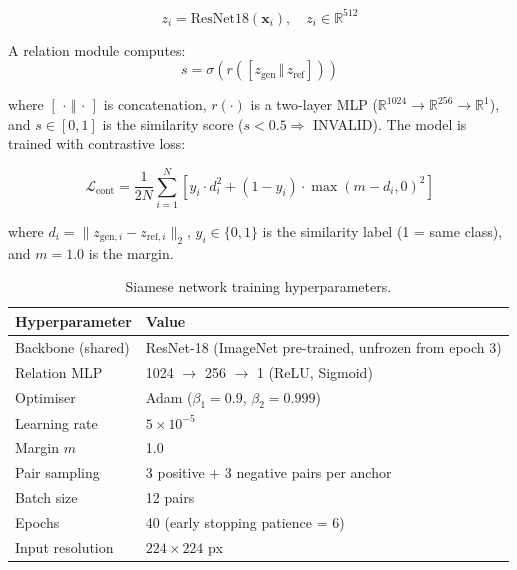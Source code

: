 \begin{equation}
z_i = \text{ResNet18}(\mathbf{x}_i),\quad z_i \in \mathbb{R}^{512}
\label{eq:encoder}
\end{equation}

A relation module computes:
\begin{equation}
s = \sigma\!\left(r\!\left([z_\text{gen} \,\Vert\, z_\text{ref}]\right)\right)
\label{eq:relation}
\end{equation}

where $[\,\cdot\,\Vert\,\cdot\,]$ is concatenation, $r(\cdot)$ is a two-layer MLP
($\mathbb{R}^{1024} \to \mathbb{R}^{256} \to \mathbb{R}^{1}$), and $s \in [0,1]$ is
the similarity score ($s < 0.5 \Rightarrow$ INVALID). The model is trained with
contrastive loss:

\begin{equation}
\mathcal{L}_\text{cont} = \frac{1}{2N}\sum_{i=1}^N
  \left[y_i \cdot d_i^2 + (1-y_i) \cdot \max(m - d_i, 0)^2\right]
\label{eq:contrastive}
\end{equation}

where $d_i = \|z_{\text{gen},i} - z_{\text{ref},i}\|_2$, $y_i \in \{0,1\}$
is the similarity label (1 = same class), and $m = 1.0$ is the margin.

\begin{table}[h]
\centering
\caption{Siamese network training hyperparameters.}
\label{tab:siamese_hparams}
\begin{tabular}{ll}
\toprule
\textbf{Hyperparameter} & \textbf{Value} \\
\midrule
Backbone (shared)   & ResNet-18 (ImageNet pre-trained, unfrozen from epoch 3) \\
Relation MLP        & 1024 $\to$ 256 $\to$ 1 (ReLU, Sigmoid) \\
Optimiser           & Adam ($\beta_1 = 0.9$, $\beta_2 = 0.999$) \\
Learning rate       & $5\times10^{-5}$ \\
Margin $m$          & 1.0 \\
Pair sampling       & 3 positive + 3 negative pairs per anchor \\
Batch size          & 12 pairs \\
Epochs              & 40 (early stopping patience = 6) \\
Input resolution    & $224 \times 224$ px \\
\bottomrule
\end{tabular}
\end{table}

